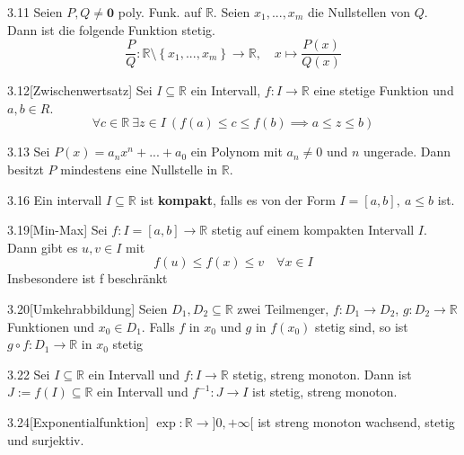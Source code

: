 \documentclass[8pt,a4paper,twocolumn,table]{extarticle}
\newcommand{\R}{\mathbb{R}}
\begin{document}
\begin{korollar}{3.11}
    Seien $P, Q \ne \mathbf{0}$ poly. Funk. auf $\R$. Seien $x_1, ..., x_m$ die Nullstellen von $Q$. Dann ist die folgende Funktion stetig.
    \[ \frac{P}{Q}: \R \setminus \left\{ x_1, ..., x_m \right\} \to \R,\quad x \mapsto \frac{P(x)}{Q(x)} \]
\end{korollar}

\begin{satz}{3.12}[Zwischenwertsatz]
    Sei $I \subseteq \R$ ein Intervall, $f: I \to \R$ eine stetige Funktion und $a, b \in R$.
    \[ \forall c \in \R \ \exists z \in I\ \left( f(a) \le c \le f(b) \implies a \le z \le b \right) \]
\end{satz}

\begin{korollar}{3.13}
    Sei $P(x) = a_nx^n + ... + a_0$ ein Polynom mit $a_n \ne 0$ und $n$ ungerade.
    Dann besitzt $P$ mindestens eine Nullstelle in $\R$.
\end{korollar}

\begin{definition}{3.16}
    Ein intervall $I \subseteq \R$ ist \textbf{kompakt}, falls es von der Form $I = [a, b],\ a \le b$ ist.
\end{definition}

\begin{satz}{3.19}[Min-Max] Sei $f: I = [a,b] \to \R$ stetig auf einem kompakten Intervall $I$.
    Dann gibt es $u,v \in I$ mit
    \[ f(u) \le f(x) \le v \quad \forall x \in I \]
    Insbesondere ist f beschränkt
\end{satz}

\begin{satz}{3.20}[Umkehrabbildung]
    Seien $D_1,D_2 \subseteq \R$ zwei Teilmenger, $f: D_1 \to D_2$, $g: D_2 \to \R$ Funktionen und $x_0 \in D_1$.
    Falls $f$ in $x_0$ und $g$ in $f(x_0)$ stetig sind, so ist $g \circ f: D_1 \to \R$ in $x_0$ stetig
\end{satz}

\begin{satz}{3.22}
    Sei $I \subseteq \R$ ein Intervall und $f: I \to \R$ stetig, streng monoton.
    Dann ist $J := f(I) \subseteq \R$ ein Intervall und $f^{-1}: J \to I$ ist stetig, streng monoton.
\end{satz}

\begin{satz}{3.24}[Exponentialfunktion]
    $\exp: \R \to ]0,+\infty[$ ist streng monoton wachsend, stetig und surjektiv.
\end{satz}
\end{document}
